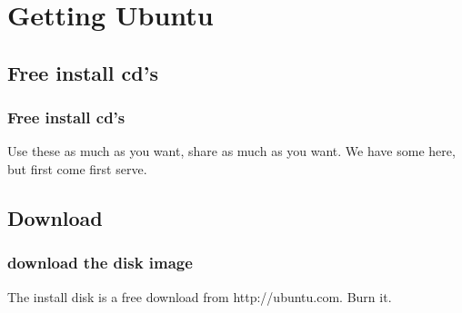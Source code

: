 \documentclass[hyperref={pdfpagelabels=false}]{beamer}
\begin{document}
\section{Getting Ubuntu}
\subsection{Free install cd's}
\frame
{
    \frametitle{Free install cd's}
    Use these as much as you want, share as much as you want. We have some here, but first come first serve.
}
\subsection{Download}
\frame
{
    \frametitle{download the disk image}
    The install disk is a free download from http://ubuntu.com. Burn it.
}
\end{document}
